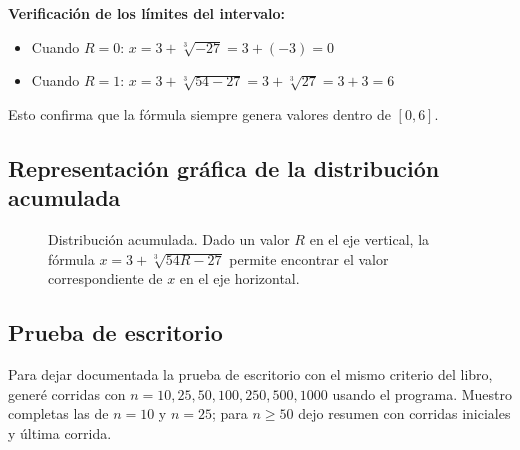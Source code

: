 \documentclass[12pt,a4paper]{article}
\begin{document}
\textbf{Verificación de los límites del intervalo:}

\begin{itemize}
  \item Cuando $R = 0$: $x = 3 + \sqrt[3]{-27} = 3 + (-3) = 0$ \checkmark{}
  \item Cuando $R = 1$: $x = 3 + \sqrt[3]{54 - 27} = 3 + \sqrt[3]{27} = 3 + 3 = 6$ \checkmark{}
\end{itemize}

Esto confirma que la fórmula siempre genera valores dentro de $[0, 6]$.

\subsection{Representación gráfica de la distribución acumulada}

\begin{figure}[H]
\centering
{}
\caption{Distribución acumulada. Dado un valor $R$ en el eje vertical, la fórmula $x = 3 + \sqrt[3]{54R-27}$ permite encontrar el valor correspondiente de $x$ en el eje horizontal.}
\end{figure}

\subsection{Prueba de escritorio}

Para dejar documentada la prueba de escritorio con el mismo criterio del libro, generé corridas con $n = 10, 25, 50, 100, 250, 500, 1000$ usando el programa. Muestro completas las de $n=10$ y $n=25$; para $n\ge 50$ dejo resumen con corridas iniciales y última corrida.
\end{document}
